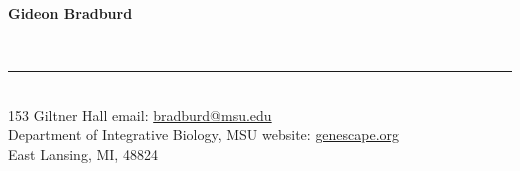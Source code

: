 \documentclass{article}
\begin{document}
%
\begin{huge}
\bf{Gideon Bradburd}\
\end{huge}
\vspace{-0.25cm}
\\
%
\vspace{-0.7cm}
\rule{470pt}{0.4pt}
\vspace{0.3cm}
%
\\
153 Giltner Hall \hfill email: \href{mailto:bradburd@msu.edu}{bradburd@msu.edu}\\
Department of Integrative Biology, MSU \hfill website: \href{http://genescape.org}{genescape.org}\\
East Lansing, MI, 48824 \hfill \\
\end{document}
